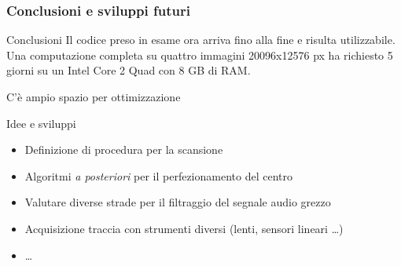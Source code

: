 \begin{frame}
\frametitle{Conclusioni e sviluppi futuri}
\begin{block}{Conclusioni}
Il codice preso in esame ora arriva fino alla fine e risulta utilizzabile.
Una computazione completa su quattro immagini 20096x12576 px ha richiesto 5 giorni su 
un Intel Core 2 Quad con 8 GB di RAM.

C'\`e ampio spazio per ottimizzazione
\end{block}

\begin{block}{Idee e sviluppi}
\begin{itemize}
\item Definizione di procedura per la scansione
\item Algoritmi \emph{a posteriori} per il perfezionamento del centro
\item Valutare diverse strade per il filtraggio del segnale audio grezzo
\item Acquisizione traccia con strumenti diversi (lenti, sensori lineari \dots)
\item \dots
\end{itemize}
\end{block}

\end{frame}
